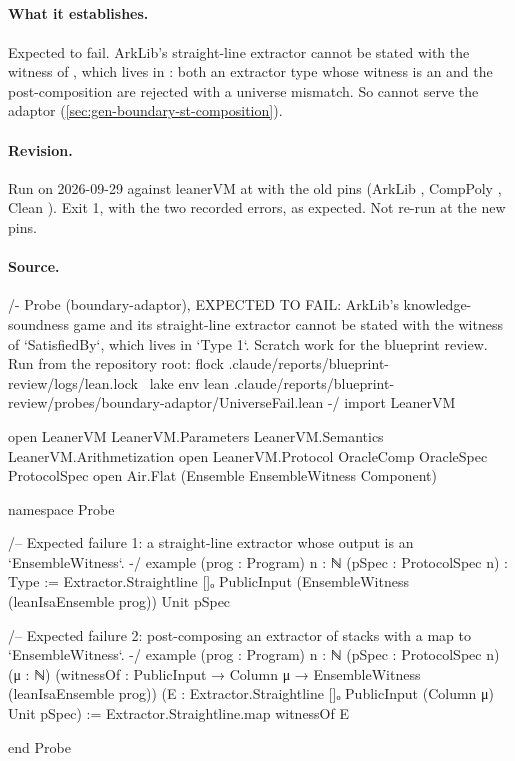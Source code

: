 \subsection{\texorpdfstring{\protect{}}{UniverseFail}}\label{sec:gen-boundary-probe-universefail}

\paragraph{What it establishes.} Expected to fail. ArkLib's straight-line extractor
cannot be stated with the witness of , which lives in : both an
extractor type whose witness is an  and the post-composition
 are rejected with a universe mismatch. So
 cannot serve the adaptor
(\cref{sec:gen-boundary-st-composition}).

\paragraph{Revision.} Run on 2026-09-29 against leanerVM  at  with the old pins (ArkLib , CompPoly , Clean ). Exit 1, with the two recorded errors, as expected. Not re-run at the new pins.

\paragraph{Source.}
\begin{leancode}[numbers=left,numbersep=3pt]
/-
  Probe (boundary-adaptor), EXPECTED TO FAIL: ArkLib's knowledge-soundness game and its
  straight-line extractor cannot be stated with the witness of `SatisfiedBy`, which lives in
  `Type 1`. Scratch work for the blueprint review.
  Run from the repository root:
    flock .claude/reports/blueprint-review/logs/lean.lock \
      lake env lean .claude/reports/blueprint-review/probes/boundary-adaptor/UniverseFail.lean
-/
import LeanerVM

open LeanerVM LeanerVM.Parameters LeanerVM.Semantics LeanerVM.Arithmetization
open LeanerVM.Protocol OracleComp OracleSpec ProtocolSpec
open Air.Flat (Ensemble EnsembleWitness Component)

namespace Probe

/-- Expected failure 1: a straight-line extractor whose output is an `EnsembleWitness`. -/
example (prog : Program) {n : ℕ} (pSpec : ProtocolSpec n) : Type :=
  Extractor.Straightline []ₒ PublicInput (EnsembleWitness (leanIsaEnsemble prog)) Unit pSpec

/-- Expected failure 2: post-composing an extractor of stacks with a map to `EnsembleWitness`. -/
example (prog : Program) {n : ℕ} (pSpec : ProtocolSpec n) (μ : ℕ)
    (witnessOf : PublicInput → Column μ → EnsembleWitness (leanIsaEnsemble prog))
    (E : Extractor.Straightline []ₒ PublicInput (Column μ) Unit pSpec) :=
  Extractor.Straightline.map witnessOf E

end Probe
\end{leancode}

